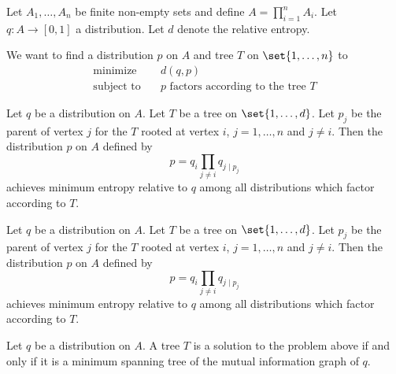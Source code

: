 
Let $A_1, \dots, A_n$ be finite non-empty sets and define $A = \prod_{i = 1}^{n} A_i$.
Let $q: A \to [0, 1]$ a distribution.
Let $d$ denote the relative
entropy.

We want to find a distribution $p$
on $A$ and tree $T$ on
$\set{1, \dots, n}$ to
\[
  \begin{aligned}
    \text{minimize}   &\quad d(q, p) \\
    \text{subject to} &\quad p \text{ factors according to the tree } T
  \end{aligned}
\]


\begin{prop}
  Let $q$ be a distribution on $A$. Let $T$ be
  a tree on $\set{1, \dots, d}$. Let $p_j$ be
  the parent of vertex $j$ for the $T$ rooted
  at vertex $i$, $j = 1,\dots,n$ and $j \neq i$.
  Then the distribution $p$ on $A$ defined by
  \[
    p = q_i \prod_{j \neq i} q_{j \mid p_j}
  \]
  achieves minimum entropy relative to $q$ among
  all distributions which factor according to $T$.
\end{prop}

\begin{prop}
  Let $q$ be a distribution on $A$. Let $T$ be
  a tree on $\set{1, \dots, d}$. Let $p_j$ be
  the parent of vertex $j$ for the $T$ rooted
  at vertex $i$, $j = 1,\dots,n$ and $j \neq i$.
  Then the distribution $p$ on $A$ defined by
  \[
    p = q_i \prod_{j \neq i} q_{j \mid p_j}
  \]
  achieves minimum entropy relative to $q$ among
  all distributions which factor according to $T$.
\end{prop}

\begin{prop}
  Let $q$ be a distribution on $A$.
  A tree
  $T$ is a solution to the problem above
  if and only if it is a minimum spanning
  tree of the mutual information graph of $q$.
\end{prop}
\strats
